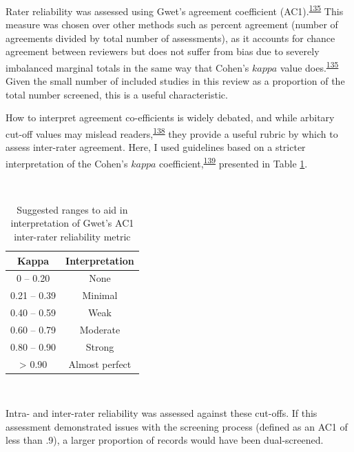 \documentclass[a4paper, twoside]{templates/ociamthesis}
\begin{document}
Rater reliability was assessed using Gwet's agreement coefficient (AC1).\textsuperscript{\protect\hyperlink{ref-gwet2008}{135}} This measure was chosen over other methods such as percent agreement (number of agreements divided by total number of assessments), as it accounts for chance agreement between reviewers but does not suffer from bias due to severely imbalanced marginal totals in the same way that Cohen's \(kappa\) value does.\textsuperscript{\protect\hyperlink{ref-gwet2008}{135}} Given the small number of included studies in this review as a proportion of the total number screened, this is a useful characteristic.

How to interpret agreement co-efficients is widely debated, and while arbitary cut-off values may mislead readers,\textsuperscript{\protect\hyperlink{ref-brennan1992}{138}} they provide a useful rubric by which to assess inter-rater agreement. Here, I used guidelines based on a stricter interpretation of the Cohen's \(kappa\) coefficient,\textsuperscript{\protect\hyperlink{ref-mchugh2012}{139}} presented in Table \ref{tab:gwet-table}.

~





\begin{table}[H]

\caption[Ranges for Gwet's AC1]{\label{tab:gwet-table}Suggested ranges to aid in interpretation of Gwet's AC1 inter-rater reliability metric}
\centering
\begin{tabular}[t]{cc}
\toprule
\textbf{Kappa} & \textbf{Interpretation}\\
\midrule
0    – 0.20 & None\\
\midrule
0.21 – 0.39 & Minimal\\
\midrule
0.40 – 0.59 & Weak\\
\midrule
0.60 – 0.79 & Moderate\\
\midrule
0.80 – 0.90 & Strong\\
\midrule
\addlinespace
> 0.90 & Almost perfect\\
\bottomrule
\end{tabular}
\end{table}

~

Intra- and inter-rater reliability was assessed against these cut-offs. If this assessment demonstrated issues with the screening process (defined as an AC1 of less than .9), a larger proportion of records would have been dual-screened.
\end{document}
